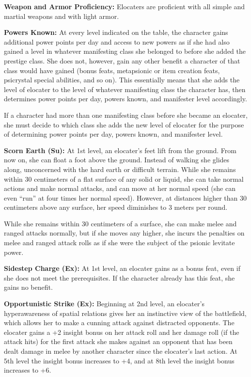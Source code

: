 {
\textbf{Weapon and Armor Proficiency:} Elocaters are proficient with all simple and martial weapons and with light armor.

\textbf{Powers Known:} At every level indicated on the table, the character gains additional power points per day and access to new powers as if she had also gained a level in whatever manifesting class she belonged to before she added the prestige class. She does not, however, gain any other benefit a character of that class would have gained (bonus feats, metapsionic or item creation feats, psicrystal special abilities, and so on). This essentially means that she adds the level of elocater to the level of whatever manifesting class the character has, then determines power points per day, powers known, and manifester level accordingly.

If a character had more than one manifesting class before she became an elocater, she must decide to which class she adds the new level of elocater for the purpose of determining power points per day, powers known, and manifester level.

\textbf{Scorn Earth (Su):} At 1st level, an elocater's feet lift from the ground. From now on, she can float a foot above the ground. Instead of walking she glides along, unconcerned with the hard earth or difficult terrain. While she remains within 30 centimeters of a flat surface of any solid or liquid, she can take normal actions and make normal attacks, and can move at her normal speed (she can even ``run'' at four times her normal speed). However, at distances higher than 30 centimeters above any surface, her speed diminishes to 3 meters per round.

While she remains within 30 centimeters of a surface, she can make melee and ranged attacks normally, but if she moves any higher, she incurs the penalties on melee and ranged attack rolls as if she were the subject of the psionic levitate power.

\textbf{Sidestep Charge (Ex):} At 1st level, an elocater gains  as a bonus feat, even if she does not meet the prerequisites. If the character already has this feat, she gains no benefit.

\textbf{Opportunistic Strike (Ex):} Beginning at 2nd level, an elocater's hyperawareness of spatial relations gives her an instinctive view of the battlefield, which allows her to make a cunning attack against distracted opponents. The elocater gains a +2 insight bonus on her attack roll and her damage roll (if the attack hits) for the first attack she makes against an opponent that has been dealt damage in melee by another character since the elocater's last action. At 5th level the insight bonus increases to +4, and at 8th level the insight bonus increases to +6.

}
